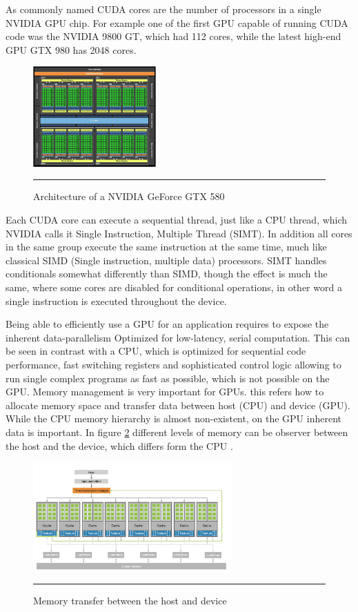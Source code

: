 As commonly named CUDA cores are the number of processors in a single NVIDIA GPU chip. For example one of the first GPU capable of running CUDA code was the NVIDIA 9800 GT, which had 112 cores, while the latest high-end GPU GTX 980 has 2048 cores.

\begin{figure}[htbp]
	\centering
		\includegraphics[width=0.42\textwidth]{Figures/GPU_CPU.png}
		\rule{35em}{0.5pt}
	\caption[Architecture of a GPU]{Architecture of a NVIDIA GeForce GTX 580}
	\label{fig:gpu_cpu}
\end{figure}


Each CUDA core can execute a sequential thread, just like a CPU thread, which NVIDIA calls it Single Instruction, Multiple Thread (SIMT). In addition all cores in the same group execute the same instruction at the same time, much like classical SIMD (Single instruction, multiple data) processors. SIMT handles conditionals somewhat differently than SIMD, though the effect is much the same, where some cores are disabled for conditional operations, in other word a single instruction is executed throughout the device.

Being able to efficiently use a GPU for an application requires to expose the inherent data-parallelism Optimized for low-latency, serial computation. This can be seen in contrast with a CPU, which is optimized for sequential code performance, fast switching registers  and sophisticated control logic allowing to run single complex programs as fast as possible, which is not possible on the GPU. Memory management is very important for GPUs. this refers how to allocate memory space and transfer data between host (CPU) and device (GPU). While the CPU memory hierarchy is almost non-existent, on the GPU inherent data is important. In figure \ref{fig:arch} different levels of memory can be observer between the host and the device, which differs form the CPU \cite{hwu}.

\begin{figure}[htbp]
	\centering
		\includegraphics[width=0.68\textwidth]{Figures/arch.png}
		\rule{35em}{0.5pt}
	\caption[Host and Device]{Memory transfer between the host and device}
	\label{fig:arch}
\end{figure}


